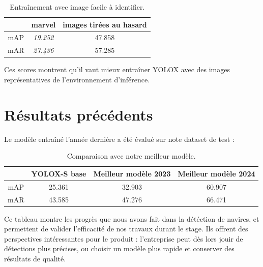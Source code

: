 \begin{table}[H]
    \begin{center}
        \begin{tabular}{c c c}
            \hline
            & marvel & images tirées au hasard\\
            \hline
            mAP & \textit{19.252} & 47.858 \\
            mAR & \textit{27.436} & 57.285 \\
        \end{tabular}
    \end{center}
    \caption{Entraînement avec image facile à identifier.}
\end{table}

Ces scores montrent qu'il vaut mieux entraîner YOLOX avec des images représentatives de
l'environnement d'inférence.

\section{Résultats précédents}

Le modèle entraîné l'année dernière a été évalué sur note dataset de test : \\

\begin{table}[h]
    \begin{center}
        \begin{tabular}{c c c c}
            \hline
            & YOLOX-S base & Meilleur modèle 2023 & \textbf{Meilleur modèle 2024} \\
            \hline
            mAP & 25.361 & 32.903 & 60.907 \\
            mAR & 43.585 & 47.276 & 66.471 \\
        \end{tabular}
    \end{center}
    \caption{Comparaison avec notre meilleur modèle.}
\end{table}

Ce tableau montre les progrès que nous avons fait dans la détéction de navires,
et permettent de valider l'efficacité de nos travaux durant le stage. 
Ils offrent des perspectives intéressantes pour le produit : 
l'entreprise peut dès lors jouir de détections plus précises, 
ou choisir un modèle plus rapide et conserver des résultats de qualité. 
